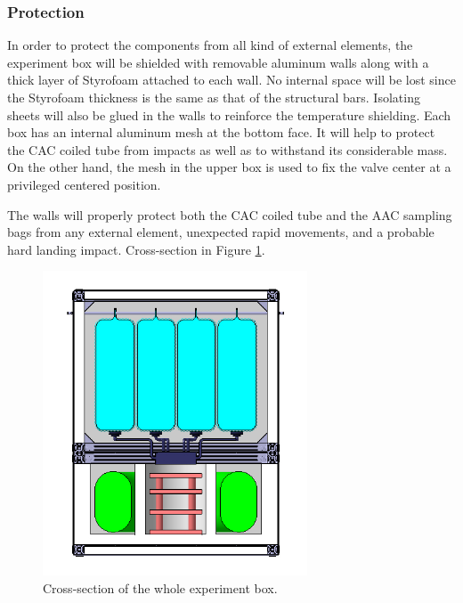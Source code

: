 \pagebreak
\subsubsection{Protection}

In order to protect the components from all kind of external elements, the experiment box will be shielded with removable aluminum walls along with a thick layer of Styrofoam attached to each wall. No internal space will be lost since the Styrofoam thickness is the same as that of the structural bars. Isolating sheets will also be glued in the walls to reinforce the temperature shielding. Each box has an internal aluminum mesh at the bottom face. It will help to protect the CAC coiled tube from impacts as well as to withstand its considerable mass. On the other hand, the mesh in the upper box is used to fix the valve center at a privileged centered position.

The walls will properly protect both the CAC coiled tube and the AAC sampling bags from any external element, unexpected rapid movements, and a probable hard landing impact. Cross-section in Figure \ref{cut_all}. 



\begin{figure}[!ht]
    \centering
    \includegraphics[width=0.7\textwidth]{4-experiment-design/img/tall_frontal.jpg}
    \caption{Cross-section of the whole experiment box.}
    \label{cut_all}
\end{figure}

